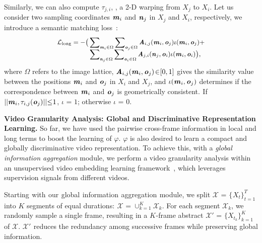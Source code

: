 \documentclass[10pt,twocolumn,letterpaper]{article}
\begin{document}
Similarly, we can also compute $\tau_{j,i}$, \ie, a 2-D warping from $X_j$ to $X_i$. Let us consider two sampling coordinates $\textbf{\textit{m}}_i$ and $\textbf{\textit{n}}_j$ in $X_j$ and $X_i$, respectively, we introduce a semantic matching loss~\!\cite{rocco2018end}:
\vspace{-1pt}
\begin{equation}\small
\begin{aligned}
\mathcal{L}_{\text{long}}=-\big(&\sum\nolimits_{\textbf{\textit{m}}_i\in\Omega}\sum\nolimits_{\textbf{\textit{o}}_j\in\Omega}\textbf{\textit{A}}_{i,j}(\textbf{\textit{m}}_i, \textbf{\textit{o}}_j)\iota(\textbf{\textit{m}}_i, \textbf{\textit{o}}_j)+\\[-2mm] &\sum\nolimits_{\textbf{\textit{n}}_j\in\Omega}\sum\nolimits_{\textbf{\textit{o}}_i\in\Omega}\textbf{\textit{A}}_{j,i}(\textbf{\textit{n}}_j, \textbf{\textit{o}}_i)\iota(\textbf{\textit{m}}_i, \textbf{\textit{o}}_i)\big),
\end{aligned}
\label{equ:semantic-matching}
\vspace{-1pt}
\end{equation}
where $\Omega$ refers to the image lattice, $\textbf{\textit{A}}_{i,j}(\textbf{\textit{m}}_i, \textbf{\textit{o}}_j)\!\in_{\!}\![0,1]$ gives the similarity value between the positions $\textbf{\textit{m}}_i$ and $\textbf{\textit{o}}_j$ in $X_i$ and $X_j$, and $\iota(\textbf{\textit{m}}_i, \textbf{\textit{o}}_j)$ determines if the correspondence between $\textbf{\textit{m}}_i$ and $\textbf{\textit{o}}_j$ is geometrically consistent.$_{\!}$ If$_{\!}$ $||\textbf{\textit{m}}_i, \tau_{i,j}(\textbf{\textit{o}}_j)||_{\!}\!\leq_{\!}\!1$, $\iota_{\!}\!=_{\!}\!1$; otherwise $\iota_{\!}\!=_{\!}\!0$.




\noindent\textbf{Video Granularity Analysis: Global and Discriminative Representation Learning.} So far, we have used the pairwise cross-frame information in local and long terms to boost the learning of $\varphi$. $\varphi$ is also desired to learn a compact and globally discriminative video representation. To achieve this, with a \textit{global information aggregation} module, we perform a video granularity analysis within an unsupervised video embedding learning framework~\!\cite{dosovitskiy2014discriminative}, which leverages supervision signals from different videos.

Starting$_{\!}$ with$_{\!}$ our$_{\!}$ global$_{\!}$ information$_{\!}$ aggregation$_{\!}$ module, we split $\mathcal{X}_{\!}\!=_{\!}\!\{_{\!}X_{t\!}\}_{t=1\!}^T$ into $K$ segments of equal durations:$_{\!}$ \!$\mathcal{X}_{\!}\!=\!\cup^K_{k=1}\mathcal{X}_k$. For each segment  $\mathcal{X}_{k}$, we randomly sample a single frame, resulting in a $K_{\!}$-frame abstract  $\mathcal{X}'_{\!}\!\!=_{\!}\!\{X_{t_k}\}_{k=1\!}^K$ of $\mathcal{X}$. $\mathcal{X}'_{\!}$ reduces the redundancy among successive frames while preserving global information.
\end{document}
